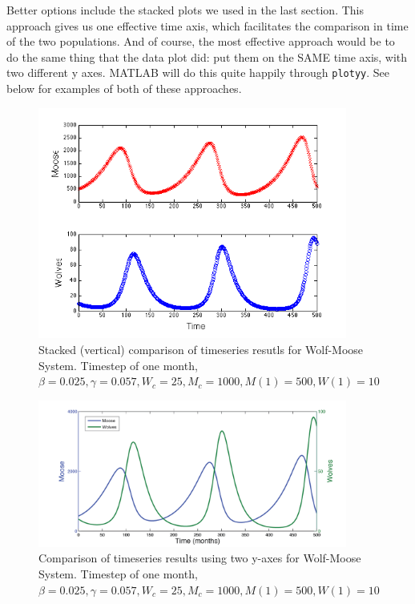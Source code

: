 Better options include the stacked plots we used in the last section.  This approach gives us one effective time axis, which facilitates the comparison in time of the two populations.  And of course, the most effective approach would be to do the same thing that the data plot did:  put them on the SAME time axis, with two different y axes.  MATLAB will do this quite happily through {\tt plotyy}. See below for examples of both of these approaches.

\begin{figure}
\includegraphics[width=4in]{figs/StackedWolfMooseTimeSeries}
\caption{Stacked (vertical) comparison of timeseries resutls for Wolf-Moose System. Timestep of one month,   $\beta = 0.025, \gamma = 0.057, W_c = 25, M_c=1000, M(1) = 500, W(1) = 10$}
\end{figure}



\begin{figure}
\includegraphics[width=4in]{figs/CombinedWolfMooseTimeSeries}
\caption{Comparison of timeseries results using two y-axes for Wolf-Moose System. Timestep of one month,   $\beta = 0.025, \gamma = 0.057, W_c = 25, M_c=1000, M(1) = 500, W(1) = 10$}
\end{figure}

